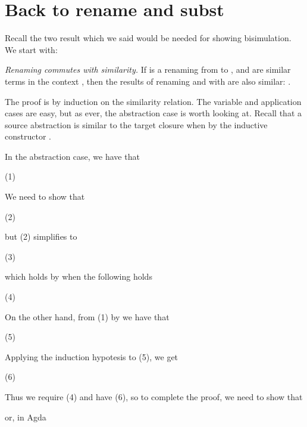 \documentclass[bsc,frontabs,twoside,singlespacing,parskip,deptreport]{infthesis}
\theoremstyle{definition}
\begin{document}
\section{Back to \ti rename and \ti subst}

Recall the two result which we said would be needed for showing
bisimulation. We start with:

\textit{Renaming commutes with similarity.} If  is a renaming from
 to , and  are similar terms in the context
, then the results of renaming  and  with 
are also similar: .


The proof is by induction on the similarity relation. The variable and
application cases are easy, but as ever, the abstraction case is worth
looking at. Recall that a source abstraction is similar to the target
closure  when 
by the inductive constructor .

In the abstraction case, we have that

 (1)

We need to show that

 (2)

but (2) simplifies to

 (3)

which holds by  when the following holds

 (4)

On the other hand, from (1) by  we have that

 (5)

Applying the induction hypotesis to (5), we get

 (6)

Thus we require (4) and have (6), so to complete the proof, we need to
show that 


or, in Agda

\end{document}
